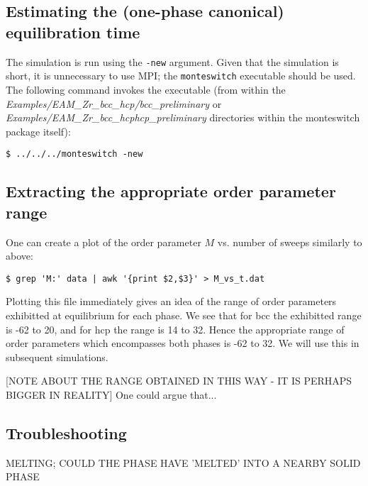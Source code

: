 \documentclass{report}
\begin{document}
\subsection{Estimating the (one-phase canonical) equilibration time}
The simulation is run using the \texttt{-new} argument. Given that the simulation is short, it is unnecessary to use MPI; the \texttt{monteswitch} executable
should be used. The following command invokes the executable (from within the \emph{Examples/EAM\_Zr\_bcc\_hcp/bcc\_preliminary} or 
\emph{Examples/EAM\_Zr\_bcc\_hcphcp\_preliminary} directories within the monteswitch package itself):
\begin{verbatim}
$ ../../../monteswitch -new
\end{verbatim}

\subsection{Extracting the appropriate order parameter range}
One can create a plot of the order parameter $M$ vs. number of sweeps similarly to above:
\begin{verbatim}
$ grep 'M:' data | awk '{print $2,$3}' > M_vs_t.dat
\end{verbatim}
Plotting this file immediately gives an idea of the range of order parameters exhibitted at equilibrium for each phase. We see that for
bcc the exhibitted range is -62 to 20, and for hcp the range is 14 to 32. Hence the appropriate range of order parameters which encompasses
both phases is -62 to 32. We will use this in subsequent simulations. 

[NOTE ABOUT THE RANGE OBTAINED IN THIS WAY - IT IS PERHAPS BIGGER IN REALITY]
One could argue that...

\subsection{Troubleshooting}
MELTING; COULD THE PHASE HAVE 'MELTED' INTO A NEARBY SOLID PHASE
\end{document}
